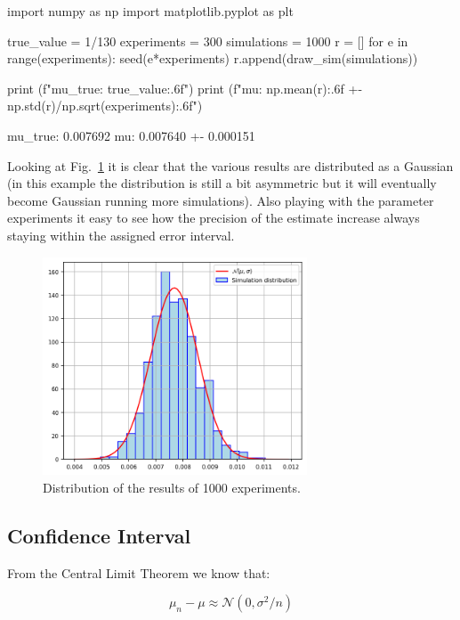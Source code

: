 \begin{ipython}
import numpy as np
import matplotlib.pyplot as plt

true_value = 1/130
experiments = 300
simulations = 1000
r = []
for e in range(experiments):
    seed(e*experiments)
    r.append(draw_sim(simulations))

print (f"mu_true: {true_value:.6f}")
print (f"mu: {np.mean(r):.6f} +- {np.std(r)/np.sqrt(experiments):.6f}")
\end{ipython}
\begin{ioutput}
mu_true: 0.007692
mu: 0.007640 +- 0.000151
\end{ioutput}

Looking at Fig.~\ref{fig:repeated_MC} it is clear that the various results are distributed as a Gaussian (in this example the distribution is still a bit asymmetric but it will eventually become Gaussian running more simulations). Also playing with the parameter experiments it easy to see how the precision of the estimate increase always staying within the assigned error interval.

\begin{figure}[htb]
\centering
\includegraphics[width=0.7\textwidth]{figures/experiment_distribution}
\caption{Distribution of the results of 1000 experiments.}
\label{fig:repeated_MC}
\end{figure}

\subsection{Confidence Interval}

From the Central Limit Theorem we know that: 

\begin{equation}
\mu_n - \mu \approx \mathcal{N}(0, \sigma^2/n)
\end{equation}

